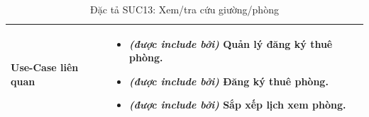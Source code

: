 \begin{table}[H]
\begin{tabularx}{\textwidth}{|>{\centering\arraybackslash\bfseries}m{3.5cm}|X|}
    \hline
    Use-Case liên quan &
    \begin{itemize}[leftmargin=*, nosep, label=-]
        \vspace{0.1cm}
        \item \textit{(được include bởi)} Quản lý đăng ký thuê phòng.
        \item \textit{(được include bởi)} Đăng ký thuê phòng.
        \item \textit{(được include bởi)} Sắp xếp lịch xem phòng.
\end{itemize} \\
    \hline
\end{tabularx}
\caption{Đặc tả SUC13: Xem/tra cứu giường/phòng}
\end{table}

\vspace{1cm}

